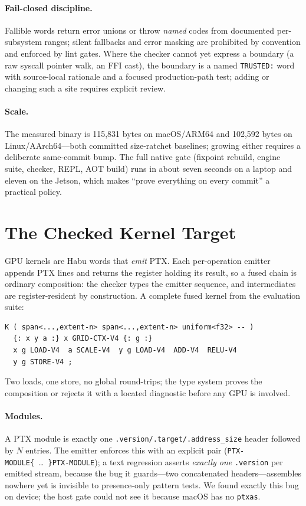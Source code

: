 \documentclass[11pt]{article}
\newcommand{\code}[1]{\texttt{#1}}
\begin{document}
\paragraph{Fail-closed discipline.} Fallible words return error unions or
throw \emph{named} codes from documented per-subsystem ranges; silent
fallbacks and error masking are prohibited by convention and enforced by
lint gates. Where the checker cannot yet express a boundary (a raw
syscall pointer walk, an FFI cast), the boundary is a named
\code{TRUSTED:} word with source-local rationale and a focused
production-path test; adding or changing such a site requires explicit review.

\paragraph{Scale.} The measured binary is 115{,}831 bytes on macOS/ARM64
and 102{,}592 bytes on Linux/AArch64---both committed size-ratchet
baselines; growing either requires a deliberate same-commit bump. The
full native gate (fixpoint rebuild, engine suite, checker, REPL, AOT
build) runs in about seven seconds on a laptop and eleven on the Jetson,
which makes ``prove everything on every commit'' a practical policy.

\section{The Checked Kernel Target}\label{sec:target}
GPU kernels are Habu words that \emph{emit} PTX. Each per-operation
emitter appends PTX lines and returns the register holding its result, so
a fused chain is ordinary composition: the checker types the emitter
sequence, and intermediates are register-resident by construction. A
complete fused kernel from the evaluation suite:
\begin{verbatim}
K ( span<...,extent-n> span<...,extent-n> uniform<f32> -- )
  {: x y a :} x GRID-CTX-V4 {: g :}
  x g LOAD-V4  a SCALE-V4  y g LOAD-V4  ADD-V4  RELU-V4
  y g STORE-V4 ;
\end{verbatim}
Two loads, one store, no global round-trips; the type system proves the
composition or rejects it with a located diagnostic before any GPU is
involved.

\paragraph{Modules.} A PTX module is exactly one
\code{.version/.target/.address\_size} header followed by $N$ entries.
The emitter enforces this with an explicit pair
(\code{PTX-MODULE\{}~\dots~\code{\}PTX-MODULE}); a text regression
asserts \emph{exactly one} \code{.version} per emitted stream, because
the bug it guards---two concatenated headers---assembles nowhere yet is
invisible to presence-only pattern tests. We found exactly this bug on
device; the host gate could not see it because macOS has no
\code{ptxas}.
\end{document}
